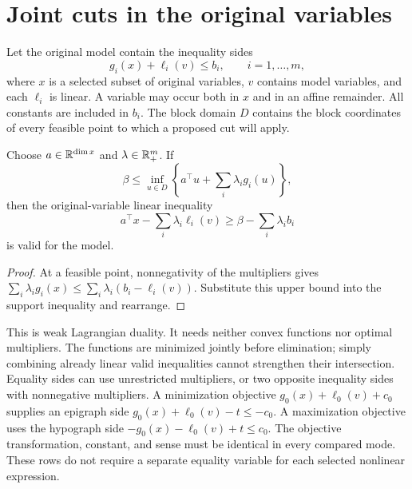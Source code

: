 \section{Joint cuts in the original variables}\label{sec:aggregation}

Let the original model contain the inequality sides
\begin{equation}\label{eq:sides}
g_i(x)+\ell_i(v)\le b_i,\qquad i=1,\ldots,m,
\end{equation}
where $x$ is a selected subset of original variables, $v$ contains model
variables, and each $\ell_i$ is linear. A variable may occur both in $x$
and in an affine remainder. All constants are included in $b_i$.
The block domain $D$ contains the block coordinates of every feasible
point to which a proposed cut will apply.

\begin{proposition}\label{prop:aggregate}
Choose $a\in\mathbb R^{\dim x}$ and $\lambda\in\mathbb R^m_+$. If
\[
\beta\le\inf_{u\in D}\left\{a^\top u+
                         \sum_i\lambda_i g_i(u)\right\},
\]
then the original-variable linear inequality
\begin{equation}\label{eq:aggregate}
a^\top x-\sum_i\lambda_i\ell_i(v)
\ge\beta-\sum_i\lambda_i b_i
\end{equation}
is valid for the model.
\end{proposition}
\begin{proof}
At a feasible point, nonnegativity of the multipliers gives
$\sum_i\lambda_i g_i(x)\le\sum_i\lambda_i(b_i-\ell_i(v))$.
Substitute this upper bound into the support inequality and rearrange.
\end{proof}

This is weak Lagrangian duality. It needs neither convex functions nor
optimal multipliers. The functions are minimized jointly before elimination;
simply combining already linear valid inequalities cannot strengthen their
intersection. Equality sides can use unrestricted multipliers, or two
opposite inequality sides with nonnegative multipliers. A minimization
objective $g_0(x)+\ell_0(v)+c_0$ supplies an epigraph side
$g_0(x)+\ell_0(v)-t\le-c_0$. A maximization objective uses the
hypograph side $-g_0(x)-\ell_0(v)+t\le c_0$. The objective
transformation, constant, and sense must be identical in every compared
mode. These rows do not require a separate equality variable for each
selected nonlinear expression.

